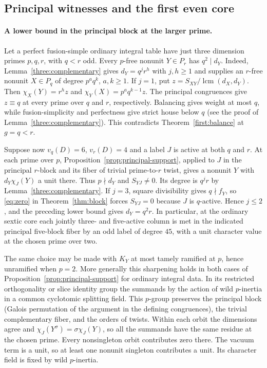 \documentclass[11pt,a4paper]{article}
\numberwithin{equation}{section}
\theoremstyle{remark}
\begin{document}
\subsection{Principal witnesses and the first even core}\label{found:C:6}
\paragraph{A lower bound in the principal block at the larger prime.}
Let a perfect fusion-simple ordinary integral table have just three
dimension primes $p,q,r$, with $q<r$ odd. Every $p$-free nonunit
$Y\in P_r$ has $q^2\mid d_Y$. Indeed, Lemma~\ref{three:complementary} gives
$d_Y=q^j r^h$ with $j,h\ge1$ and supplies an $r$-free nonunit
$X\in P_q$ of degree $p^a q^k$, $a,k\ge1$. If $j=1$, put
$z=S_{XY}/\operatorname{lcm}(d_X,d_Y)$. Then
$\chi_X(Y)=r^h z$ and $\chi_Y(X)=p^a q^{k-1}z$.
The principal congruences give $z\equiv q$ at every prime over
$q$ and $r$, respectively. Balancing gives weight at most $q$, while
fusion-simplicity and perfectness give strict house below $q$
(see the proof of Lemma~\ref{three:complementary}). This contradicts Theorem~\ref{first:balance} at $g=q<r$.

Suppose now $v_q(D)=6$, $v_r(D)=4$ and a label $J$ is active at
both $q$ and $r$. At each prime over $p$, Proposition~\ref{prop:principal-support},
applied to $J$ in the principal $r$-block and its fiber of trivial
prime-to-$r$ twist, gives a nonunit $Y$ with $d_Y\chi_J(Y)$ a
unit there. Thus $p\nmid d_Y$ and $S_{YJ}\ne0$. Its degree is
$q^j r$ by Lemma~\ref{three:complementary}. If $j=3$, square divisibility gives
$q\nmid f_Y$, so \eqref{eq:zero} in Theorem~\ref{thm:block} forces $S_{YJ}=0$
because $J$ is $q$-active. Hence $j\le2$, and the preceding lower
bound gives $d_Y=q^2r$. In particular, at the ordinary sextic core
each jointly three- and five-active column is met in the indicated
principal five-block fiber by an odd label of degree $45$, with a
unit character value at the chosen prime over two.

The same choice may be made with $K_Y$ at most tamely ramified at $p$,
hence unramified when $p=2$. More generally this sharpening holds
in both cases of Proposition~\ref{prop:principal-support} for ordinary integral data.
In its restricted orthogonality or slice identity group the summands
by the action of wild $p$-inertia in a common cyclotomic splitting
field. This $p$-group preserves the principal block (Galois
permutation of the argument in the defining congruences), the trivial
complementary fiber, and the orders of twists. Within each orbit the
dimensions agree and $\chi_J(Y^\sigma)=\sigma\chi_J(Y)$, so all
the summands have the same residue at the chosen prime. Every
nonsingleton orbit contributes zero there. The vacuum term is a
unit, so at least one nonunit singleton contributes a unit. Its
character field is fixed by wild $p$-inertia.
\end{document}
